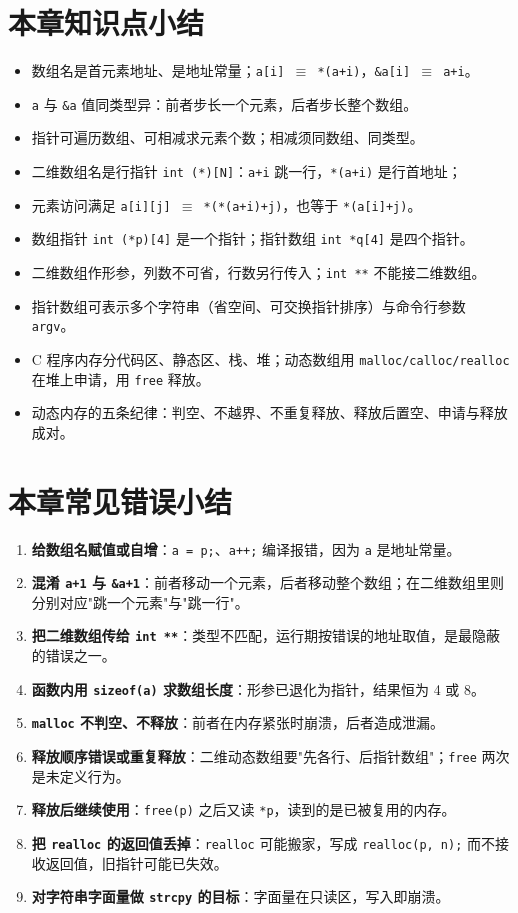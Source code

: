 \section{本章知识点小结}
\begin{itemize}
  \item 数组名是首元素地址、是地址常量；\texttt{a[i] $\equiv$ *(a+i)}，\texttt{\&a[i] $\equiv$ a+i}。
  \item \texttt{a} 与 \texttt{\&a} 值同类型异：前者步长一个元素，后者步长整个数组。
  \item 指针可遍历数组、可相减求元素个数；相减须同数组、同类型。
  \item 二维数组名是行指针 \texttt{int (*)[N]}：\texttt{a+i} 跳一行，\texttt{*(a+i)} 是行首地址；
  \item 元素访问满足 \texttt{a[i][j] $\equiv$ *(*(a+i)+j)}，也等于 \texttt{*(a[i]+j)}。
  \item 数组指针 \texttt{int (*p)[4]} 是一个指针；指针数组 \texttt{int *q[4]} 是四个指针。
  \item 二维数组作形参，列数不可省，行数另行传入；\texttt{int **} 不能接二维数组。
  \item 指针数组可表示多个字符串（省空间、可交换指针排序）与命令行参数 \texttt{argv}。
  \item C 程序内存分代码区、静态区、栈、堆；动态数组用 \texttt{malloc/calloc/realloc} 在堆上申请，用 \texttt{free} 释放。
  \item 动态内存的五条纪律：判空、不越界、不重复释放、释放后置空、申请与释放成对。
\end{itemize}

\section{本章常见错误小结}
\begin{enumerate}
  \item \textbf{给数组名赋值或自增}：\texttt{a = p;}、\texttt{a++;} 编译报错，因为 \texttt{a} 是地址常量。
  \item \textbf{混淆 \texttt{a+1} 与 \texttt{\&a+1}}：前者移动一个元素，后者移动整个数组；在二维数组里则分别对应"跳一个元素"与"跳一行"。
  \item \textbf{把二维数组传给 \texttt{int **}}：类型不匹配，运行期按错误的地址取值，是最隐蔽的错误之一。
  \item \textbf{函数内用 \texttt{sizeof(a)} 求数组长度}：形参已退化为指针，结果恒为 4 或 8。
  \item \textbf{\texttt{malloc} 不判空、不释放}：前者在内存紧张时崩溃，后者造成泄漏。
  \item \textbf{释放顺序错误或重复释放}：二维动态数组要"先各行、后指针数组"；\texttt{free} 两次是未定义行为。
  \item \textbf{释放后继续使用}：\texttt{free(p)} 之后又读 \texttt{*p}，读到的是已被复用的内存。
  \item \textbf{把 \texttt{realloc} 的返回值丢掉}：\texttt{realloc} 可能搬家，写成 \texttt{realloc(p, n);} 而不接收返回值，旧指针可能已失效。
  \item \textbf{对字符串字面量做 \texttt{strcpy} 的目标}：字面量在只读区，写入即崩溃。
\end{enumerate}
